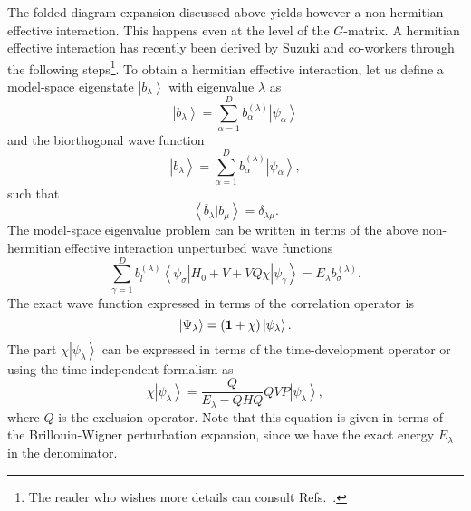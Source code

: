 \documentclass[twoside,12pt]{article}
\begin{document}
The folded diagram expansion discussed above yields however
a non-hermitian effective interaction. This happens even at the
level of the $G$-matrix.
A hermitian effective interaction has recently been derived by
Suzuki and co-workers \cite{so95,so84,kehlsok93} through the
following steps\footnote{The reader who wishes more details can consult
Refs.\ \cite{so95,kehlsok93}.}.
To obtain a hermitian effective interaction,
let us define
a model-space eigenstate
$\left | b_{\lambda}\right\rangle$ with eigenvalue $\lambda$ as
\begin{equation}
     \left | b_{\lambda}\right\rangle=\sum_{\alpha =1}^{D}
     b_{\alpha}^{(\lambda )}\left | \psi_{\alpha}\right\rangle
\end{equation}
and the biorthogonal wave function
\begin{equation}
     \left | \overline{b}_{\lambda}\right\rangle=\sum_{\alpha=1}^{D}
      \overline{b}_{\alpha}^{(\lambda )}
     \left | \overline{\psi}_{\alpha}\right\rangle,
\end{equation}
such that
\begin{equation}
     {\left\langle \overline{b}_{\lambda} | b_{\mu} \right\rangle}=
     \delta_{\lambda\mu}.
\end{equation}
The model-space eigenvalue problem can be written
in terms of the above non-hermitian effective interaction unperturbed
wave functions
\begin{equation}
     {\displaystyle
     \sum_{\gamma =1}^{D}b_l^{(\lambda )}\left\langle \psi_{\sigma}\right |
     H_0+V+VQ\chi\left | \psi_{\gamma}\right\rangle}  =
     E_{\lambda}b_{\sigma}^{(\lambda )}.
\end{equation}
The exact wave function expressed in terms of the correlation
operator is
\begin{equation}
      \left | \Psi_{\lambda}\right\rangle=
      ({\bf 1}+\chi)\left | \psi_{\lambda}\right\rangle.
\end{equation}
The part $\chi\left | \psi_{\lambda}\right\rangle$ can be expressed in terms
of the time-development operator or
using the time-independent formalism as
\begin{equation}
  \chi\left | \psi_{\lambda}\right\rangle=
  \frac{Q}{E_{\lambda}-QHQ}QVP\left | \psi_{\lambda}\right\rangle,
  \label{eq:newchi}
\end{equation}
where $Q$ is the exclusion operator. Note that this equation is given
in terms of the Brillouin-Wigner perturbation expansion, since
we have the exact energy $E_{\lambda}$ in the denominator.
\end{document}
